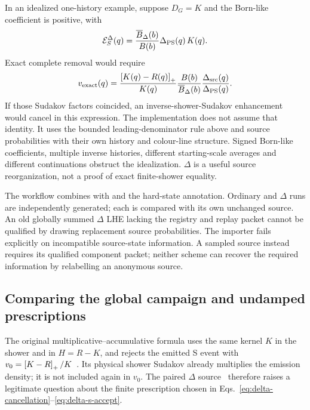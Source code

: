 In an idealized one-history example, suppose $D_G=K$ and the
Born-like coefficient is positive, with
\begin{equation}
 \mathcal E_S^\Delta(q)=
       \frac{\overline B_\Delta(b)}{B(b)}
       \Delta_{\rm PS}(q)\,K(q).
 \label{eq:delta-ideal-s}
\end{equation}
Exact complete removal would require
\begin{equation}
 v_{\rm exact}(q)=
  \frac{\left[K(q)-R(q)\right]_+}{K(q)}
  \frac{B(b)}{\overline B_\Delta(b)}
  \frac{\Delta_{\rm src}(q)}{\Delta_{\rm PS}(q)}.
 \label{eq:delta-exact-ideal}
\end{equation}
If those Sudakov factors coincided, an inverse-shower-Sudakov
enhancement would cancel in this expression.
The implementation does not assume that identity.
It uses the bounded leading-denominator rule above and source
probabilities with their own history and colour-line structure.
Signed Born-like coefficients, multiple inverse histories,
different starting-scale averages and different continuations
obstruct the idealization.
$\Delta$ is a useful source reorganization, not a proof of exact
finite-shower equality.

The workflow combines  with
 and the hard-state annotation.
Ordinary and $\Delta$ runs are independently generated;
each is compared with its own unchanged source.
An old globally summed $\Delta$ LHE lacking the registry and replay packet cannot be
qualified by drawing replacement source probabilities.
The importer fails explicitly on incompatible source-state information.
A sampled source instead requires its qualified component packet;
neither scheme can recover the required information by relabelling an
anonymous source.

\subsection{Comparing the global campaign and undamped prescriptions}
\label{sec:delta-undamped-audit}

The original multiplicative--accumulative formula uses the same kernel
$K$ in the shower and in $H=R-K$, and rejects the emitted S event with
$v_0=\left[K-R\right]_+/K$~\cite[Eq.~(3.1)]{NasonSalam}.
Its physical shower Sudakov already multiplies the emission density;
it is not included again in $v_0$.
The paired $\Delta$ source~\cite[Eqs.~(3.2)--(3.3)]{DeltaMatching}
therefore raises a legitimate question about the finite prescription
chosen in Eqs.~\eqref{eq:delta-cancellation}--\eqref{eq:delta-s-accept}.

